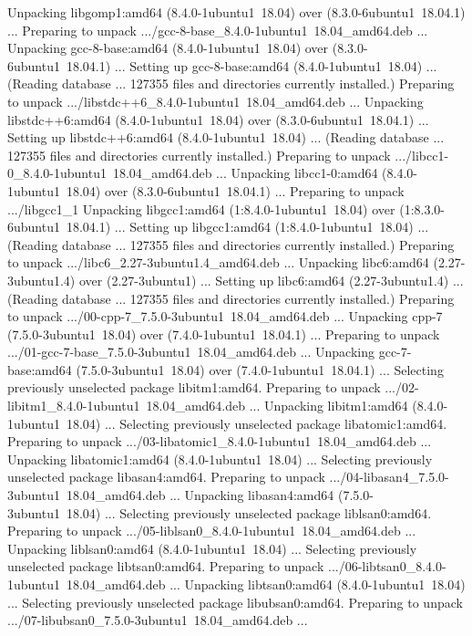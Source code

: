 Unpacking libgomp1:amd64 (8.4.0-1ubuntu1~18.04) over (8.3.0-6ubuntu1~18.04.1) ...
Preparing to unpack .../gcc-8-base_8.4.0-1ubuntu1~18.04_amd64.deb ...
Unpacking gcc-8-base:amd64 (8.4.0-1ubuntu1~18.04) over (8.3.0-6ubuntu1~18.04.1) ...
Setting up gcc-8-base:amd64 (8.4.0-1ubuntu1~18.04) ...
(Reading database ... 127355 files and directories currently installed.)
Preparing to unpack .../libstdc++6_8.4.0-1ubuntu1~18.04_amd64.deb ...
Unpacking libstdc++6:amd64 (8.4.0-1ubuntu1~18.04) over (8.3.0-6ubuntu1~18.04.1) ...
Setting up libstdc++6:amd64 (8.4.0-1ubuntu1~18.04) ...
(Reading database ... 127355 files and directories currently installed.)
Preparing to unpack .../libcc1-0_8.4.0-1ubuntu1~18.04_amd64.deb ...
Unpacking libcc1-0:amd64 (8.4.0-1ubuntu1~18.04) over (8.3.0-6ubuntu1~18.04.1) ...
Preparing to unpack .../libgcc1_1%
Unpacking libgcc1:amd64 (1:8.4.0-1ubuntu1~18.04) over (1:8.3.0-6ubuntu1~18.04.1) ...
Setting up libgcc1:amd64 (1:8.4.0-1ubuntu1~18.04) ...
(Reading database ... 127355 files and directories currently installed.)
Preparing to unpack .../libc6_2.27-3ubuntu1.4_amd64.deb ...
Unpacking libc6:amd64 (2.27-3ubuntu1.4) over (2.27-3ubuntu1) ...
Setting up libc6:amd64 (2.27-3ubuntu1.4) ...
(Reading database ... 127355 files and directories currently installed.)
Preparing to unpack .../00-cpp-7_7.5.0-3ubuntu1~18.04_amd64.deb ...
Unpacking cpp-7 (7.5.0-3ubuntu1~18.04) over (7.4.0-1ubuntu1~18.04.1) ...
Preparing to unpack .../01-gcc-7-base_7.5.0-3ubuntu1~18.04_amd64.deb ...
Unpacking gcc-7-base:amd64 (7.5.0-3ubuntu1~18.04) over (7.4.0-1ubuntu1~18.04.1) ...
Selecting previously unselected package libitm1:amd64.
Preparing to unpack .../02-libitm1_8.4.0-1ubuntu1~18.04_amd64.deb ...
Unpacking libitm1:amd64 (8.4.0-1ubuntu1~18.04) ...
Selecting previously unselected package libatomic1:amd64.
Preparing to unpack .../03-libatomic1_8.4.0-1ubuntu1~18.04_amd64.deb ...
Unpacking libatomic1:amd64 (8.4.0-1ubuntu1~18.04) ...
Selecting previously unselected package libasan4:amd64.
Preparing to unpack .../04-libasan4_7.5.0-3ubuntu1~18.04_amd64.deb ...
Unpacking libasan4:amd64 (7.5.0-3ubuntu1~18.04) ...
Selecting previously unselected package liblsan0:amd64.
Preparing to unpack .../05-liblsan0_8.4.0-1ubuntu1~18.04_amd64.deb ...
Unpacking liblsan0:amd64 (8.4.0-1ubuntu1~18.04) ...
Selecting previously unselected package libtsan0:amd64.
Preparing to unpack .../06-libtsan0_8.4.0-1ubuntu1~18.04_amd64.deb ...
Unpacking libtsan0:amd64 (8.4.0-1ubuntu1~18.04) ...
Selecting previously unselected package libubsan0:amd64.
Preparing to unpack .../07-libubsan0_7.5.0-3ubuntu1~18.04_amd64.deb ...
